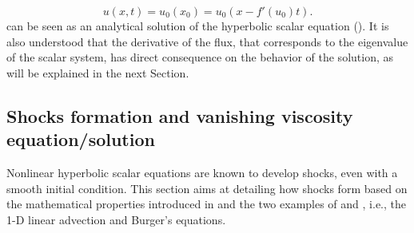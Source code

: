 %
\begin{equation}\label{eq:ivp5_sct1b}
u(x,t) = u_0(x_0) = u_0(x - f'(u_0)t) .
\end{equation}
%
 can be seen as an analytical solution of the hyperbolic scalar equation (). It is also understood that the derivative of the flux, that corresponds to the eigenvalue of the scalar system, has direct consequence on the behavior of the solution, as will be explained in the next Section. %

\subsection{Shocks formation and vanishing viscosity equation/solution}\label{sec:shock_form_sct1b}
Nonlinear hyperbolic scalar equations are known to develop shocks, even with a smooth initial condition. This section aims at detailing how shocks form based on the mathematical properties introduced in  and the two examples of  and , i.e., the 1-D linear advection and Burger's equations.

